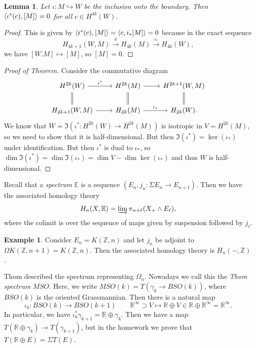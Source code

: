 \documentclass[leqno, openany]{memoir}
\newtheorem{lem}[thm]{Lemma}
\theoremstyle{definition}
\newtheorem{exm}[thm]{Example}
\theoremstyle{remark}
\theoremstyle{plain}
\theoremstyle{definition}
\theoremstyle{remark}
\newcommand{\R}{\mathbb{R}}
\newcommand{\Z}{\mathbb{Z}}
\begin{document}
\begin{lem}
    Let $\iota \colon M \hookrightarrow W$ be the inclusion onto the boundary. Then $\ev{\iota^*(c), [M]} = 0$ for all $c \in H^{4k}(W)$.
\end{lem}

\begin{proof}
    This is given by $\ev{i^*(c), [M]} = \ev{c, i_* [M]} = 0$ because in the exact sequence 
    \[ H_{4k+1}(W, M) \xrightarrow{\delta} H_{4k}(M) \xrightarrow{\iota_*} H_{4k}(W),\]
    we have $[W.M] \mapsto [M]$, so $[M] = 0$.
\end{proof}

\begin{proof}[Proof of Theorem]
    Consider the commutative diagram
    \begin{equation*}
    \begin{tikzcd}
        H^{2k}(W) \ar{r}{\iota^*} \ar[equal]{d} & H^{2k}(M) \ar[equal]{d} \ar{r} & H^{2k+1}(W, M) \ar[equal]{d} \\
        H_{2k+1}(W, M) \ar{r} & H_{2k}(M) \ar{r}{\iota_*} & H_{2k}(W).
    \end{tikzcd}
    \end{equation*}
    We know that $W = \Im(\iota^* \colon H^{2k}(W) \to H^{2k}(M))$ is isotropic in $V = H^{2k}(M)$, so we need to show that it is half-dimensional. But then $\Im(\iota^*) = \ker (\iota_*)$ under identification. But then $\iota^*$ is dual to $\iota_*$, so $\dim \Im(\iota^*) = \dim \Im(\iota_*) = \dim V - \dim \ker (\iota_*)$ and thus $W$ is half-dimensional.
\end{proof}

Recall that a \textit{spectrum} $\mathbb{E}$ is a sequence $(E_n, j_n \colon \Sigma E_n \to E_{n+1})$. Then we have the associated homology theory
\[ H_n(X, \mathbb{E}) = \varinjlim \pi_{n+\ell} (X_+ \wedge E_{\ell}), \]
where the colimit is over the sequence of maps given by suspension followed by $j_{\ell}$.

\begin{exm}
    Consider $E_n = K(\Z, n)$ and let $j_n$ be adjoint to $\Omega K(\Z, n+1) = K(\Z, n)$. Then the associated homology theory is $H_n(-, \Z)$.
\end{exm}

Thom described the spectrum representing $\Omega_n$. Nowadays we call this the \textit{Thom spectrum} $MSO$. Here, we write $MSO(k) = T(\gamma_k \to BSO(k))$, where $BSO(k)$ is the oriented Grassmannian. Then there is a natural map 
\[ \iota_k \colon BSO(k) \to BSO(k+1) \qquad \R^{\infty} \supset V \mapsto \R \oplus V \in \R \oplus \R^{\infty} = \R^{\infty}. \] 
In particular, we have $\iota_k^* \gamma_{k+1} = \underline{\R} \oplus \gamma_k$. Then we have a map $T(\R \oplus \gamma_k) \to T(\gamma_{k+1})$, but in the homework we prove that $T(\R \oplus E) = \Sigma T(E)$.
\end{document}
